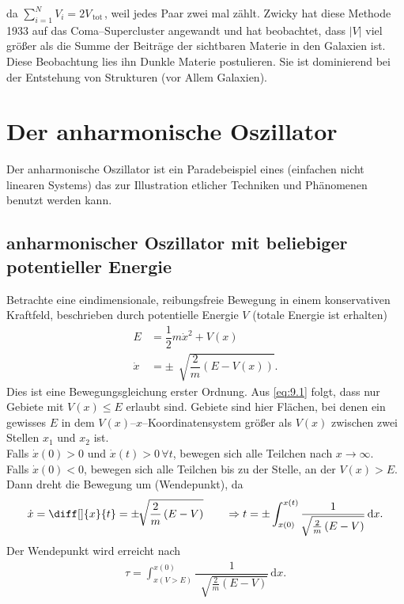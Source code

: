 \documentclass[a4paper,12pt]{article}
\newcommand{\td}{\,\text{d}}
\numberwithin{equation}{section}
\begin{document}
da $\sum_{i=1}^{N}V_i=2V_{\,\text{tot}\,}$, weil jedes Paar zwei mal zählt. Zwicky hat diese Methode 1933 auf das Coma--Supercluster angewandt und hat beobachtet, dass $|V|$ viel größer als die Summe der Beiträge der sichtbaren Materie in den Galaxien ist. Diese Beobachtung lies ihn \glqq Dunkle Materie\grqq{} postulieren. Sie ist dominierend bei der Entstehung von Strukturen (vor Allem Galaxien).

\newpage
\section{Der anharmonische Oszillator}
Der anharmonische Oszillator ist ein Paradebeispiel eines (einfachen nicht linearen Systems) das zur Illustration etlicher Techniken und Phänomenen benutzt werden kann.

\subsection{anharmonischer Oszillator mit beliebiger potentieller Energie}
Betrachte eine eindimensionale, reibungsfreie Bewegung in einem konservativen Kraftfeld, beschrieben durch potentielle Energie $V$ (totale Energie ist erhalten)
\begin{align} 
        E&=\dfrac{1}{2}m\dot{x}^2+V\left(x\right)\nonumber \\
        \dot{x}&=\pm \,\sqrt[]{\dfrac{2}{m}\left(E-V\left(x\right)\right)}\label{eq:9.1}
.\end{align} 
Dies ist eine Bewegungsgleichung erster Ordnung. Aus \eqref{eq:9.1} folgt, dass nur Gebiete mit $V\left(x\right)\leq E$ erlaubt sind. Gebiete sind hier Flächen, bei denen ein gewisses $E$ in dem $V\left(x\right)$--$x$--Koordinatensystem größer als $V\left(x\right)$ zwischen zwei Stellen $x_1$ und $x_2$ ist.\\\indent
Falls $\dot{x}\left(0\right)>0$ und $\dot{x}\left(t\right)>0\,\forall t$, bewegen sich alle Teilchen nach $x\rightarrow \infty$.\\\indent
Falls $\dot{x}\left(0\right)<0$, bewegen sich alle Teilchen bis zu der Stelle, an der $V\left(x\right)>E$. Dann dreht die Bewegung um (Wendepunkt), da
\begin{align} 
        \dot{x}=\diff[]{x}{t}=\pm \,\sqrt[]{\dfrac{2}{m}\left(E-V\right)}\qquad \Rightarrow t=\pm \int_{x\left(0\right)}^{x\left(t\right)}\dfrac{1}{\,\sqrt[]{\tfrac{2}{m}\left(E-V\right)}}\td x\label{eq:9.2}
.\end{align} 
Der Wendepunkt wird erreicht nach
\begin{align*} 
        \tau =\int_{x\left(V>E\right)}^{x\left(0\right)}\dfrac{1}{\,\sqrt[]{\tfrac{2}{m}\left(E-V\right)}}\td x
.\end{align*} 
\end{document}
